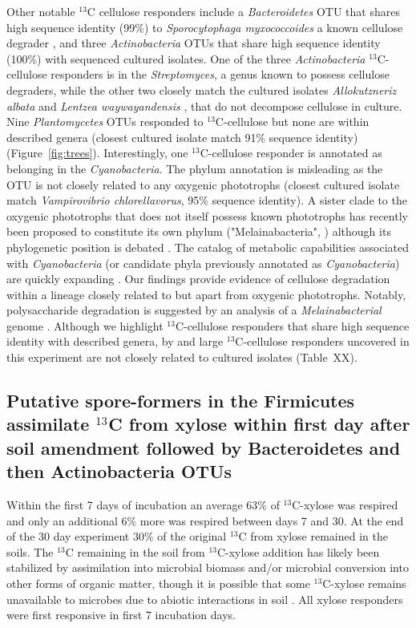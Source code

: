 Other notable $^{13}$C cellulose responders include a \textit{Bacteroidetes}
OTU that shares high sequence identity (99\%) to \textit{Sporocytophaga
myxococcoides} a known cellulose degrader \citep{Vance_1980}, and three
\textit{Actinobacteria} OTUs that share high sequence identity (100\%) with
sequenced cultured isolates. One of the three \textit{Actinobacteria}
$^{13}$C-cellulose responders is in the \textit{Streptomyces}, a genus known to
possess cellulose degraders, while the other two closely match the cultured isolates
\textit{Allokutzneriz albata} \citep{Labeda_2008, Tomita_1993} and
\textit{Lentzea waywayandensis} \citep{LABEDA_1989, Labeda_2001}, that do not
decompose cellulose in culture. Nine \textit{Plantomycetes} OTUs responded to
$^{13}$C-cellulose but none are within described genera (closest cultured isolate
match 91\% sequence identity) (Figure~\ref{fig:trees}). Interestingly, one
$^{13}$C-cellulose responder is annotated as belonging in the \textit{Cyanobacteria}. The phylum
annotation is misleading as the OTU is not closely related to any oxygenic
phototrophs (closest cultured isolate match \textit{Vampirovibrio chlorellavorus},
95\% sequence identity). A sister clade to the oxygenic phototrophs that does
not itself possess known phototrophs has recently been proposed to constitute
its own phylum ("Melainabacteria", \citet{Di_Rienzi_2013}) although its
phylogenetic position is debated \citep{Soo_2014}. The catalog of metabolic
capabilities associated with \textit{Cyanobacteria} (or candidate phyla
previously annotated as \textit{Cyanobacteria}) are quickly expanding
\citep{Di_Rienzi_2013, Soo_2014}.  Our findings provide evidence of cellulose
degradation within a lineage closely related to but apart from oxygenic
phototrophs. Notably, polysaccharide degradation is suggested by an analysis
of a \textit{Melainabacterial} genome \citep{Di_Rienzi_2013}. Although we
highlight $^{13}$C-cellulose responders that share high sequence identity with
described genera, by and large $^{13}$C-cellulose responders uncovered in this
experiment are not closely related to cultured isolates (Table~XX).

\subsection{Putative spore-formers in the Firmicutes assimilate $^{13}$C from
xylose within first day after soil amendment followed by Bacteroidetes and then
Actinobacteria OTUs} 
Within the first 7 days of incubation an average 63\% of $^{13}$C-xylose was
respired and only an additional 6\% more was respired between days 7 and 30. At
the end of the 30 day experiment 30\% of the original $^{13}$C from xylose
remained in the soils. The $^{13}$C remaining in the soil from $^{13}$C-xylose
addition has likely been stabilized by assimilation into microbial biomass
and/or microbial conversion into other forms of organic matter, though it is
possible that some $^{13}$C-xylose remains unavailable to microbes due to
abiotic interactions in soil \citep{Kalbitz_2000}. All xylose
responders were first responsive in first 7 incubation days. 

